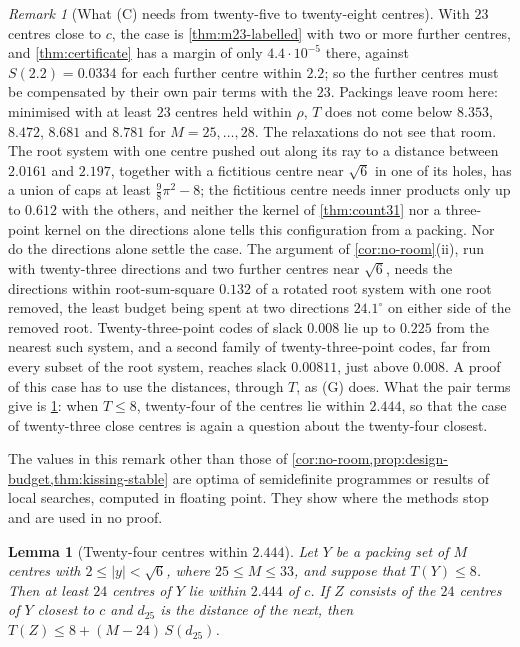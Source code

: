 \documentclass[11pt,reqno]{amsart}
\renewcommand{\_}{\origunderscore\allowbreak}
\numberwithin{equation}{section}
\theoremstyle{plain}
\newtheorem{lem}[thm]{Lemma}
\theoremstyle{definition}
\theoremstyle{remark}
\newtheorem{remark}[thm]{Remark}
\begin{document}
\begin{remark}[What (C) needs from twenty-five to twenty-eight centres]
With $23$ centres close to $c$, the case is \cref{thm:m23-labelled} with
two or more further centres, and \cref{thm:certificate} has a margin of only
$4.4\cdot10^{-5}$ there, against $S(2.2)=0.0334$ for each further centre
within $2.2$; so the further centres must be compensated by their own pair
terms with the $23$. Packings leave room here: minimised with at least $23$
centres held within $\rho$, $T$ does not come below $8.353$, $8.472$,
$8.681$ and $8.781$ for $M=25,\dots,28$. The relaxations do
not see that room. The root system with one centre pushed out along its ray
to a distance between $2.0161$ and $2.197$, together with a fictitious
centre near $\sqrt6$ in one of its holes, has a union of caps at least
$\frac98\pi^2-8$; the fictitious centre needs inner products only up to
$0.612$ with the others, and neither the kernel of \cref{thm:count31} nor a
three-point kernel on the directions alone tells this configuration from a
packing. Nor do the directions alone settle the case. The argument of
\cref{cor:no-room}(ii), run with twenty-three directions and two further
centres near $\sqrt6$, needs the directions within root-sum-square $0.132$
of a rotated root system with one root removed, the least budget being
spent at two directions $24.1^\circ$ on either side of the removed root.
Twenty-three-point codes of slack $0.008$ lie up to $0.225$ from the
nearest such system, and a second family of twenty-three-point codes, far
from every subset of the root system, reaches slack $0.00811$, just above
$0.008$. A proof of this case has to use the distances, through $T$, as (G)
does. What the pair terms give is \cref{lem:twentyfour-close}: when $T\le8$,
twenty-four of the centres lie within $2.444$, so that the case of
twenty-three close centres is again a question about the twenty-four
closest.

The values in this remark other than those of
\cref{cor:no-room,prop:design-budget,thm:kissing-stable} are optima of
semidefinite programmes or results of local searches, computed in floating
point. They show where the methods stop and are used in no proof.
\end{remark}

\begin{lem}[Twenty-four centres within $2.444$]\label{lem:twentyfour-close}
Let $Y$ be a packing set of $M$ centres with $2\le|y|<\sqrt6$, where
$25\le M\le33$, and suppose that $T(Y)\le8$. Then at least $24$ centres of
$Y$ lie within $2.444$ of $c$. If $Z$ consists of the $24$ centres of $Y$
closest to $c$ and $d_{25}$ is the distance of the next, then
$T(Z)\le8+(M-24)\,S(d_{25})$.
\end{lem}
\end{document}
